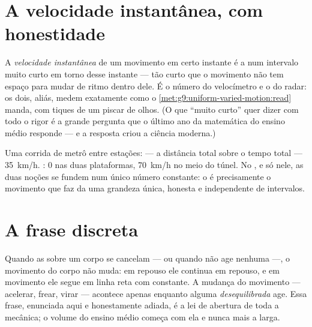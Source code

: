 \section{A velocidade instantânea, com honestidade}

\begin{definition}\label{def:g9:uniform-varied-motion:instant}
A \emph{velocidade instantânea} de um
movimento em certo instante é a  num intervalo muito
curto em torno desse instante --- tão curto que o movimento não tem
espaço para mudar de ritmo dentro dele. É o número do velocímetro e o
do radar: os dois, aliás, medem exatamente como o
\cref{met:g9:uniform-varied-motion:read} manda, com tiques de um
piscar de olhos. (O que ``muito curto'' quer dizer com todo o rigor é
a grande pergunta que o último ano da matemática do ensino médio
responde --- e a resposta criou a ciência moderna.)
\end{definition}

\begin{example}\label{ex:g9:uniform-varied-motion:sidebyside}
Uma corrida de metrô entre estações:  --- a distância
total sobre o tempo total --- \qty{35}{km/h}. : $0$ nas duas plataformas, \qty{70}{km/h} no meio do
túnel. No , e só nele, as duas noções se fundem num
único número constante: o  é precisamente o
movimento que faz da  uma grandeza única, honesta e
independente de intervalos.
\end{example}

\section{A frase discreta}

\begin{proposition}\label{prop:g9:uniform-varied-motion:inertia}
Quando as  sobre um corpo se cancelam --- ou quando não age
nenhuma ---, o movimento do corpo não muda: em repouso ele continua
em repouso, e em movimento ele segue em linha reta com 
constante. A mudança do movimento --- acelerar, frear, virar ---
acontece apenas enquanto alguma  \emph{desequilibrada} age. Essa
frase, enunciada aqui e honestamente adiada, é a lei de abertura de
toda a mecânica; o volume do ensino médio começa com ela e nunca mais
a larga.
\end{proposition}


